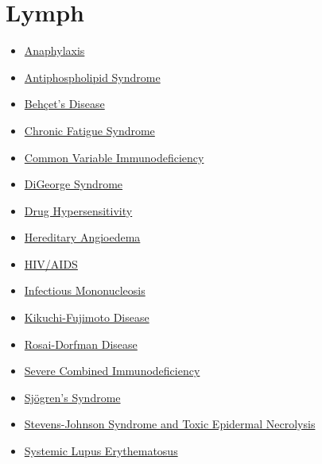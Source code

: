 \section*{Lymph}
\label{sec:organ_lymph}
\begin{itemize}[noitemsep]
  \item \hyperlink{sec:Anaphylaxis}{Anaphylaxis}
  \item \hyperlink{sec:Antiphospholipid Syndrome}{Antiphospholipid Syndrome}
  \item \hyperlink{sec:Behçet's Disease}{Behçet's Disease}
  \item \hyperlink{sec:Chronic Fatigue Syndrome}{Chronic Fatigue Syndrome}
  \item \hyperlink{sec:Common Variable Immunodeficiency}{Common Variable Immunodeficiency}
  \item \hyperlink{sec:DiGeorge Syndrome}{DiGeorge Syndrome}
  \item \hyperlink{sec:Drug Hypersensitivity}{Drug Hypersensitivity}
  \item \hyperlink{sec:Hereditary Angioedema}{Hereditary Angioedema}
  \item \hyperlink{sec:HIV/AIDS}{HIV/AIDS}
  \item \hyperlink{sec:Infectious Mononucleosis}{Infectious Mononucleosis}
  \item \hyperlink{sec:Kikuchi-Fujimoto Disease}{Kikuchi-Fujimoto Disease}
  \item \hyperlink{sec:Rosai-Dorfman Disease}{Rosai-Dorfman Disease}
  \item \hyperlink{sec:Severe Combined Immunodeficiency}{Severe Combined Immunodeficiency}
  \item \hyperlink{sec:Sjögren's Syndrome}{Sjögren's Syndrome}
  \item \hyperlink{sec:Stevens-Johnson Syndrome and Toxic Epidermal Necrolysis}{Stevens-Johnson Syndrome and Toxic Epidermal Necrolysis}
  \item \hyperlink{sec:Systemic Lupus Erythematosus}{Systemic Lupus Erythematosus}
\end{itemize}

